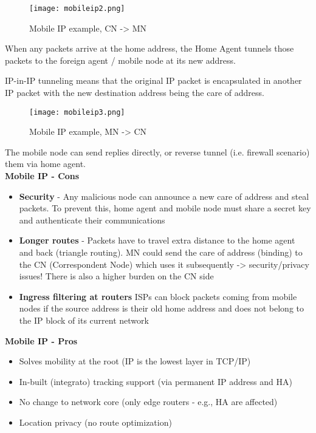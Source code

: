 \begin{figure}[H]
  \centering
  \texttt{[image: mobileip2.png]}
  \caption{Mobile IP example, CN -> MN}
  \label{fig:mobileip2}
\end{figure}

When any packets arrive at the home address, the Home Agent tunnels those
packets to the foreign agent / mobile node at its new address.

IP-in-IP tunneling means that the original IP packet is encapsulated in another
IP packet with the new destination address being the care of address.

\begin{figure}[H]
  \centering
  \texttt{[image: mobileip3.png]}
  \caption{Mobile IP example, MN -> CN}
  \label{fig:mobileip3}
\end{figure}

The mobile node can send replies directly, or reverse tunnel (i.e. firewall
scenario) them via home agent.\\

\textbf{Mobile IP - Cons}

\begin{itemize}
\item \textbf{Security} - Any malicious node can announce a new care of address
and steal packets. To prevent this, home agent and mobile node must share a
secret key and authenticate their communications
\item \textbf{Longer routes} - Packets have to travel extra distance
to the home agent and back (triangle routing).
MN could send the care of address (binding) to the CN (Correspondent Node)
which uses it subsequently -> security/privacy issues!
There is also a higher burden on the CN side
\item \textbf{Ingress filtering at routers}
ISPs can block packets coming from mobile nodes if the source address is their
old home address and does not belong to the IP block of its current network
\end{itemize}

\textbf{Mobile IP - Pros}

\begin{itemize}
\item Solves mobility at the root (IP is the lowest layer in TCP/IP)
\item In-built (integrato) tracking support (via permanent IP address and HA)
\item No change to network core (only edge routers - e.g., HA are affected)
\item Location privacy (no route optimization)
\end{itemize}

